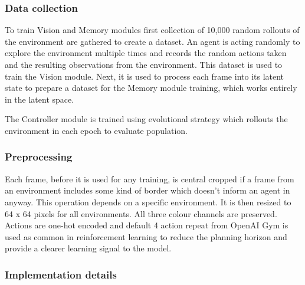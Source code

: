 \subsubsection{Data collection}

To train Vision and Memory modules first collection of 10,000 random rollouts of the environment are gathered to create a dataset. An agent is acting randomly to explore the environment multiple times and records the random actions taken and the resulting observations from the environment.
This dataset is used to train the Vision module. Next, it is used to process each frame into its latent state to prepare a dataset for the Memory module training, which works entirely in the latent space.

The Controller module is trained using evolutional strategy which rollouts the environment in each epoch to evaluate population.

\subsubsection{Preprocessing}

Each frame, before it is used for any training, is central cropped if a frame from an environment includes some kind of border which doesn't inform an agent in anyway. This operation depends on a specific environment. It is then resized to 64 x 64 pixels for all environments. All three colour channels are preserved. Actions are one-hot encoded and default 4 action repeat from OpenAI Gym \cite{Code.OpenAIGym} is used as common in reinforcement learning \cite{Algo.DQN} to reduce the planning horizon and provide a clearer learning signal to the model.

\subsubsection{Implementation details}

